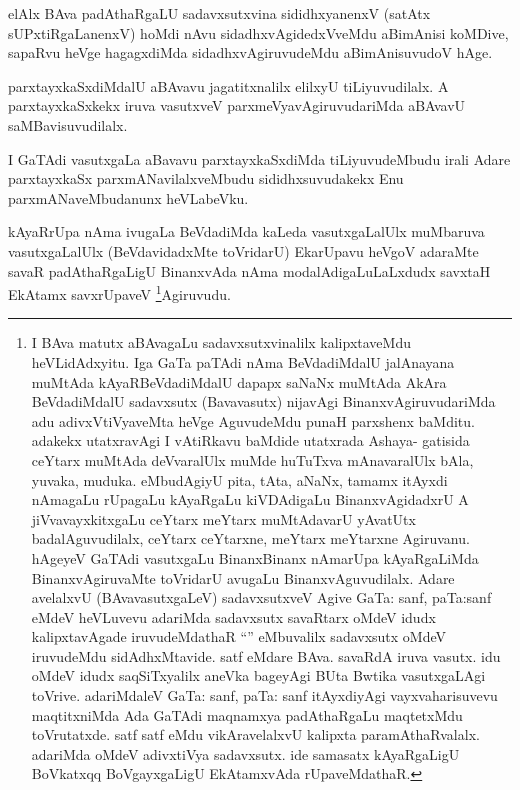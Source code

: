 
\begin{artha}
elAlx BAva padAthaRgaLU sadavxsutxvina sididhxyanenxV (satAtx sUPxtiRgaLanenxV) hoMdi nAvu sidadhxvAgidedxVveMdu aBimAnisi koMDive, sapaRvu heVge hagagxdiMda sidadhxvAgiruvudeMdu aBimAnisuvudoV hAge.
\end{artha}


\begin{artha}
parxtayxkaSxdiMdalU aBAvavu jagatitxnalilx elilxyU tiLiyuvudilalx. A parxtayxkaSxkekx iruva vasutxveV parxmeVyavAgiruvudariMda aBAvavU saMBavisuvudilalx.
\end{artha}

\begin{artha}
I GaTAdi vasutxgaLa aBavavu parxtayxkaSxdiMda tiLiyuvudeMbudu irali Adare parxtayxkaSx parxmANavilalxveMbudu sididhxsuvudakekx Enu parxmANaveMbudanunx heVLabeVku.
\end{artha}

\begin{artha}
kAyaRrUpa nAma ivugaLa BeVdadiMda kaLeda vasutxgaLalUlx muMbaruva vasutxgaLalUlx (BeVdavidadxMte toVridarU) EkarUpavu heVgoV adaraMte savaR padAthaRgaLigU BinanxvAda nAma modalAdigaLuLaLxdudx savxtaH EkAtamx savxrUpaveV \footnote{I BAva matutx aBAvagaLu sadavxsutxvinalilx kalipxtaveMdu heVLidAdxyitu. Iga GaTa paTAdi nAma BeVdadiMdalU jalAnayana muMtAda kAyaRBeVdadiMdalU dapapx saNaNx muMtAda AkAra BeVdadiMdalU sadavxsutx (Bavavasutx) nijavAgi BinanxvAgiruvudariMda adu adivxVtiVyaveMta heVge AguvudeMdu punaH parxshenx baMditu. adakekx utatxravAgi I vAtiRkavu baMdide utatxrada Ashaya- gatisida ceYtarx muMtAda deVvaralUlx muMde huTuTxva mAnavaralUlx bAla, yuvaka, muduka. eMbudAgiyU pita, tAta, aNaNx, tamamx itAyxdi nAmagaLu rUpagaLu kAyaRgaLu kiVDAdigaLu BinanxvAgidadxrU A jiVvavayxkitxgaLu ceYtarx meYtarx muMtAdavarU yAvatUtx badalAguvudilalx, ceYtarx ceYtarxne, meYtarx meYtarxne Agiruvanu. hAgeyeV GaTAdi vasutxgaLu BinanxBinanx nAmarUpa kAyaRgaLiMda BinanxvAgiruvaMte toVridarU avugaLu BinanxvAguvudilalx. Adare avelalxvU (BAvavasutxgaLeV) sadavxsutxveV Agive GaTa: sanf, paTa:sanf eMdeV heVLuvevu adariMda sadavxsutx savaRtarx oMdeV idudx kalipxtavAgade iruvudeMdathaR ``\stext'' eMbuvalilx sadavxsutx oMdeV iruvudeMdu sidAdhxMtavide. satf eMdare BAva. savaRdA iruva vasutx. idu oMdeV idudx saqSiTxyalilx aneVka bageyAgi BUta Bwtika vasutxgaLAgi toVrive. adariMdaleV GaTa: sanf, paTa: sanf itAyxdiyAgi vayxvaharisuvevu maqtitxniMda Ada GaTAdi maqnamxya padAthaRgaLu maqtetxMdu toVrutatxde. satf satf eMdu vikAravelalxvU kalipxta paramAthaRvalalx. adariMda oMdeV adivxtiVya sadavxsutx. ide samasatx kAyaRgaLigU BoVkatxqq BoVgayxgaLigU EkAtamxvAda rUpaveMdathaR.}Agiruvudu.
\end{artha}

